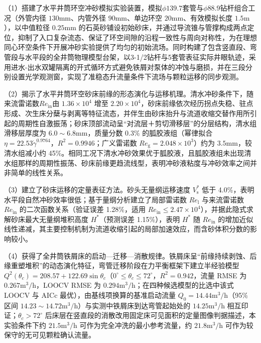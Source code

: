 （1）搭建了水平井筒环空冲砂模拟实验装置，模拟$\phi 139.7$套管与$\phi 88.9$钻杆组合工况（外管内径 $130\mathrm{mm}$、内管外径 $90\mathrm{mm}$、单边环空 $20\mathrm{mm}$、有效模拟长度 $1.5\mathrm{m}$），以中值粒径 $0.25\mathrm{mm}$ 的石英砂铺设初始砂床，并通过导流锥与管撑构成两点定位，抑制了入口复杂流态、保证了环空间隙的沿程一致性与周向对称性，为在理想同心环空条件下开展冲砂实验提供了均匀的初始流场。同时构建了包含竖直段、弯管段与水平段的全井筒物理模型台架，以3-1/2\inch 钻杆与5\inch 套管表征实际井眼轨迹，采用进水-出水双罐隔离的开式循环方式避免铁屑对泵体的冲蚀与磨损，并在三段分别设置光学观测窗，实现了准稳态升流量条件下流场与颗粒运移的同步观测。

（2）揭示了水平井筒环空砂床前缘的形态演化与运移机理。清水冲砂条件下，随来流雷诺数$Re_{\mathrm{in}}$由 $1.36\times10^4$ 增至 $2.20\times10^4$，砂床前缘依次经历拐点失稳、驻点形成、次生床分蘖与剥离等特征流态，并伴生由砂床抬升与流道收缩交替作用所引起的周期性自激振荡；砂床顶部流动呈“对流层＋剪切滑移层”的分层结构，清水组滑移层厚度为 $6.0\sim6.8\mathrm{mm}$，质量分数 0.3\% 的胍胶液组（幂律拟合 $\eta=22.53\dot\gamma^{0.9764}$，$R^2=0.9946$；广义雷诺数 $Re_\mathrm{g}=2.048\times10^{3}$）约为 $3.5\mathrm{mm}$，较清水组减小约 45\%。相同工况下清水冲砂效果优于胍胶液，且胍胶液组未出现清水组那样的周期性振荡、砂床前缘更趋流线型，表明冲砂液粘度与冲砂效率之间并非简单的线性关系。

（3）建立了砂床运移的定量表征方法。砂头无量纲运移速度 $V_\mathrm{s}^*$ 低于 4.0\%，表明水平段自然冲砂效率很低；基于量纲分析建立了局部雷诺数 $Re_\mathrm{l}$ 与来流雷诺数 $Re_{\mathrm{in}}$ 的二次函数关系（验证误差 1.28\%，适用 $Re_{\mathrm{in}}\le2.47\times10^{4}$），并据此隐式求解砂床最大无量纲堆积高度 $H^*$（预测误差 1.15\%），表明 $H^*$ 随 $Re_{\mathrm{in}}$ 的增加近似线性递减，其主要控制机制为流道收缩引起的局部加速效应，而含砂体积分数的影响较小。

（4）获得了全井筒铁屑床的启动—迁移—消散规律。铁屑床呈“前缘持续剥蚀、后缘重塑堆积”的动态演化特征，弯管迁移阶段在力平衡框架下建立半经验模型 $Q^2(\theta_c)=208.57+122.69\sin\theta_c$（$0^\circ\le\theta_c\le72^\circ$，$R^2=0.942$，流量 RMSE 为 $0.267\mathrm{m^3/h}$，LOOCV RMSE 为 $0.294\mathrm{m^3/h}$；在四种候选模型的比选中该式 LOOCV 与 AICc 最优），由基线项换算的基准启动流量 $Q_0=14.44\mathrm{m^3/h}$（95\% 区间 $14.23\sim14.72\mathrm{m^3/h}$）与实测中铁屑床到达弯管起始处的 $14.25\mathrm{m^3/h}$ 相互印证；$\theta_c>72^\circ$ 后床层在竖直段的消散改用固定床可见面积的定量图像判据描述，本实验条件下约 $21.5\mathrm{m^3/h}$ 可作为完全冲洗的最小参考流量，约 $21.8\mathrm{m^3/h}$ 可作为较保守的无可见颗粒确认流量。

